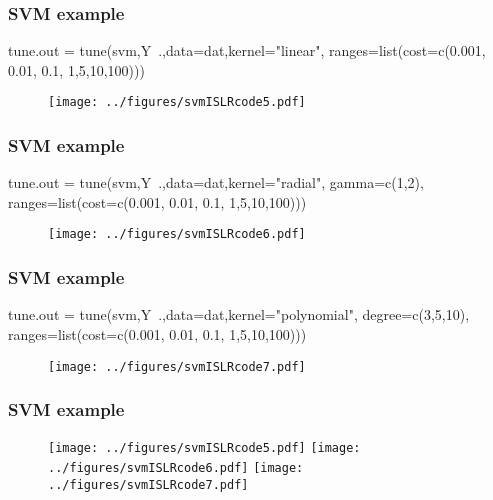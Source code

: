 \documentclass[12pt]{beamer}
\begin{document}
\begin{frame}[fragile]
\frametitle{SVM example}
\begin{blockcode}
tune.out = tune(svm,Y~.,data=dat,kernel="linear",
        ranges=list(cost=c(0.001, 0.01, 0.1, 1,5,10,100)))
\end{blockcode}
\begin{figure}
\centering
\texttt{[image: ../figures/svmISLRcode5.pdf]}
\end{figure}
\end{frame}

\begin{frame}[fragile]
\frametitle{SVM example}
\begin{blockcode}
tune.out = tune(svm,Y~.,data=dat,kernel="radial",
        gamma=c(1,2),
        ranges=list(cost=c(0.001, 0.01, 0.1, 1,5,10,100)))
\end{blockcode}
\begin{figure}
\centering
\texttt{[image: ../figures/svmISLRcode6.pdf]}
\end{figure}
\end{frame}

\begin{frame}[fragile]
\frametitle{SVM example}
\begin{blockcode}
tune.out = tune(svm,Y~.,data=dat,kernel="polynomial",
        degree=c(3,5,10),
        ranges=list(cost=c(0.001, 0.01, 0.1, 1,5,10,100)))
\end{blockcode}
\begin{figure}
\centering
\texttt{[image: ../figures/svmISLRcode7.pdf]}
\end{figure}
\end{frame}


\begin{frame}[fragile]
\frametitle{SVM example}
\begin{figure}
\centering
\texttt{[image: ../figures/svmISLRcode5.pdf]}
\texttt{[image: ../figures/svmISLRcode6.pdf]}
\texttt{[image: ../figures/svmISLRcode7.pdf]}
\end{figure}
\end{frame}

%
%
\end{document}
